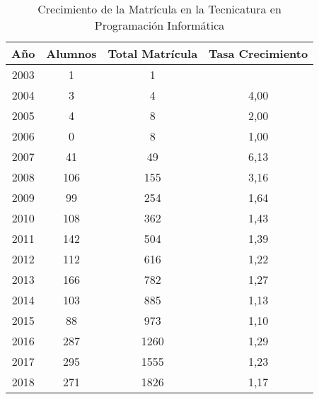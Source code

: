 \begin{table}[]
    \centering
    \begin{tabular}{|c|c|c|c|}
    \hline
    Año & Alumnos & Total Matrícula & Tasa Crecimiento \\
    \hline
    2003 & 1 & 1 & \\
    \hline
    2004 & 3 & 4 & 4,00 \\
    \hline
    2005 & 4 & 8 & 2,00 \\
    \hline
    2006 & 0 & 8 & 1,00 \\
    \hline
    2007 & 41 & 49 & 6,13 \\
    \hline
    2008 & 106 & 155 & 3,16 \\
    \hline
    2009 & 99 & 254 & 1,64 \\
    \hline
    2010 & 108 & 362 & 1,43 \\
    \hline
    2011 & 142 & 504 & 1,39 \\ 
    \hline
    2012 & 112 & 616 & 1,22 \\
    \hline
    2013 & 166 & 782 & 1,27 \\
    \hline
    2014 & 103 & 885 & 1,13 \\
    \hline
    2015 & 88 & 973 & 1,10 \\
    \hline
    2016 & 287 & 1260 & 1,29 \\
    \hline
    2017 & 295 & 1555 & 1,23 \\
    \hline
    2018 & 271 & 1826 & 1,17 \\
    \hline
    \end{tabular}
    \caption{Crecimiento de la Matrícula en la Tecnicatura en Programación Informática}
    \label{tab:tabla_planes}
\end{table}

